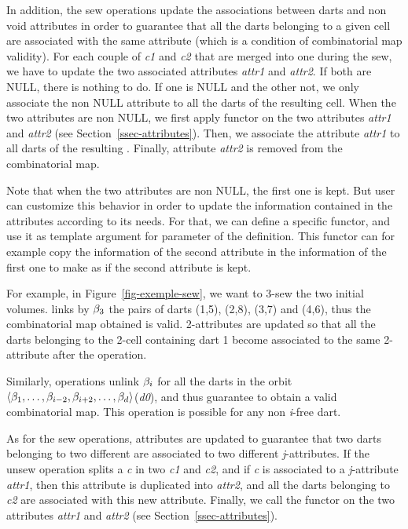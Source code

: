 In addition, the sew operations update the associations between darts
and non void attributes in order to guarantee that all the darts
belonging to a given cell are associated with the same attribute
(which is a condition of combinatorial map validity).  For each couple
of  \emph{c1} and \emph{c2} that are merged into one  during
the sew, we have to update the two associated attributes \emph{attr1} and
\emph{attr2}.  If both are NULL, there is nothing to do.  If one is NULL
and the other not, we only associate the non NULL attribute to all the
darts of the resulting cell.  When the two attributes are non NULL, we
first apply functor  on the two attributes \emph{attr1} and
\emph{attr2} (see Section~\ref{ssec-attributes}). Then, we associate the
attribute \emph{attr1} to all darts of the resulting . Finally,
attribute \emph{attr2} is removed from the combinatorial map. 

Note that when the two attributes are non NULL, the first one is
kept. But user can customize this behavior in order to update the
information contained in the attributes according to its needs.  For
that, we can define a specific functor, and use it as template
argument for  parameter of the 
definition. This functor can for example copy the information of the
second attribute in the information of the first one to make as if the
second attribute is kept.

For example, in Figure~\ref{fig-exemple-sew}, we want to 3-sew the two
initial volumes.  links by $\beta_{3}$ the pairs of
darts (1,5), (2,8), (3,7) and (4,6), thus the combinatorial map
obtained is valid. 2-attributes are updated so that all the darts
belonging to the 2-cell containing dart 1 become associated to the
same 2-attribute after the operation.
%

Similarly,  operations unlink $\beta_{i}$ for all the darts
in the orbit $\langle{}\beta_{1},\ldots,\beta_{i-2},\beta_{i+2},\ldots,\beta_{d}\rangle{}$(\emph{d0}), 
and thus guarantee to obtain a valid combinatorial map.  This
operation is possible for any non \emph{i}-free dart.

As for the sew operations, attributes are updated to
guarantee that two darts belonging to two different  are
associated to two different \emph{j}-attributes.  If the unsew operation
splits a  \emph{c} in two  \emph{c1} and \emph{c2}, and if \emph{c} is
associated to a \emph{j}-attribute \emph{attr1}, then this attribute is duplicated
into \emph{attr2}, and all the darts belonging to \emph{c2} are associated
with this new attribute.  Finally, we call the functor 
on the two attributes \emph{attr1} and \emph{attr2} (see
Section~\ref{ssec-attributes}).

